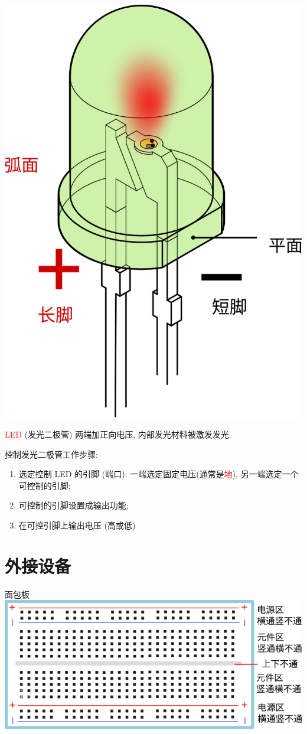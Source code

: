 \documentclass[a4paper,11pt]{seminar}
\newcommand{\alert}[1]{\textcolor{red}{#1}}
\begin{document}
\begin{minipage}[c]{.3\textwidth}
\includegraphics[width=\textwidth]{LED}
\end{minipage}
\begin{minipage}[c]{.68\textwidth}
\alert{LED} (发光二极管) 两端加正向电压, 内部发光材料被激发发光.

控制发光二极管工作步骤:
\begin{enumerate}
    \item 选定控制 LED 的引脚 (端口): 一端选定固定电压(通常是\alert{地}),
        另一端选定一个可控制的引脚;
    \item 可控制的引脚设置成输出功能;
    \item 在可控引脚上输出电压 (高或低)
\end{enumerate}
\end{minipage}
\endslide

\chapter{外接设备}{面包板}
\centering
\includegraphics[width=.7\textwidth]{breadboard}
\end{document}
